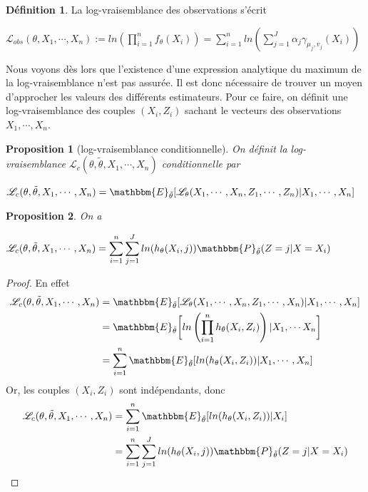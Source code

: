 \documentclass[frenchb]{report}
\newcommand{\1}{\mathbbm{1}}
\newcommand{\E}{\mathbbm{E}}
\newcommand{\prob}{\mathbbm{P}}
\newcommand{\lv}{\mathcal{L}}
\newcommand{\thetat}{\tilde{\theta}}
\newtheorem{prop}{Proposition}
\theoremstyle{definition}\newtheorem{defn}{Définition}
\theoremstyle{definition}\newtheorem{exm}{Exemple}
\theoremstyle{definition}\newtheorem{nota}{Notation}
\theoremstyle{definition}\newtheorem{rem}{Remarque}
\begin{document}
\begin{defn} 
La log-vraisemblance des observations s'écrit 
\begin{center} $\mathcal{L}_{obs}(\theta, X_1, \cdots, X_n) := ln\left( \displaystyle\prod_{i=1}^n f_\theta(X_i) \right) = \displaystyle\sum_{i=1}^nln\left( \sum_{j=1}^J \alpha_j \gamma_{\mu_j, v_j}(X_i) \right)$ \end{center}
\end{defn}

Nous voyons dès lors que l'existence d'une expression analytique du maximum de la log-vraisemblance n'est pas assurée. Il est donc nécessaire de trouver un moyen d'approcher les valeurs des différents estimateurs. \newline
Pour ce faire, on définit une log-vraisemblance des couples $(X_i,Z_i)$ sachant le vecteurs des observations $X_1, \cdots, X_n$.
\begin{prop}[log-vraisemblance conditionnelle]
On définit la log-vraisemblance $\lv_{c}(\theta, \thetat, X_1, \cdots, X_n) $ conditionnelle par
\begin{center} $\lv_{c}(\theta, \thetat, X_1, \cdots, X_n) = \E_{\thetat}[\lv_\theta(X_1, \cdots, X_n, Z_1, \cdots, Z_n) | X_1, \cdots, X_n]$ \end{center}
\end{prop}

\begin{prop}
On a
\begin{center} $\lv_{c}(\theta, \thetat, X_1, \cdots, X_n) = \displaystyle\sum_{i=1}^n\sum_{j=1}^J ln(h_\theta(X_i ,j))  \prob_{\thetat}(Z = j|X = X_i)$ \end{center}
\end{prop}

\begin{proof}
En effet
\begin{align*}
\lv_{c}(\theta, \thetat, X_1, \cdots, X_n) &= \E_{\thetat}[\lv_\theta(X_1, \cdots, X_n, Z_1, \cdots, X_n)|X_1, \cdots, X_n]\\
&=  \E_{\thetat}\bigg[\displaystyle ln\left(\prod_{i=1}^n  h_\theta(X_i,Z_i)\right) |X_1, \cdots X_n \bigg]\\
&= \displaystyle\sum_{i=1}^n  \E_{\thetat}[ln(h_\theta(X_i,Z_i))|X_1, \cdots, X_n]\\
\end{align*}
Or, les couples $(X_i,Z_i)$ sont indépendants, donc
\begin{align*}
\lv_{c}(\theta, \thetat, X_1, \cdots, X_n) &= \displaystyle\sum_{i=1}^n  \E_{\thetat}[ln(h_\theta(X_i,Z_i))|X_i ]\\
&= \displaystyle\sum_{i=1}^n \sum_{j = 1}^J ln(h_\theta(X_i,j)) \prob_{\thetat} (Z = j|X = X_i)\\
\end{align*}

\end{proof}
\end{document}
